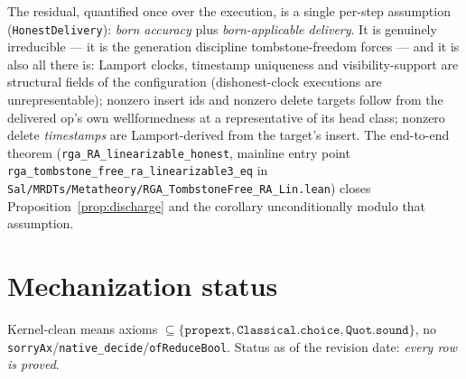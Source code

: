 \documentclass[11pt]{article}
\theoremstyle{definition}
\theoremstyle{remark}
\newcommand{\lean}[1]{\texttt{#1}}
\begin{document}
The residual, quantified once over the execution, is a single per-step assumption
(\lean{HonestDelivery}): \emph{born accuracy} plus \emph{born-applicable delivery}. It is
genuinely irreducible --- it is the generation discipline tombstone-freedom forces --- and it
is also all there is: Lamport clocks, timestamp uniqueness and visibility-support are
structural fields of the configuration (dishonest-clock executions are unrepresentable);
nonzero insert ids and nonzero delete targets follow from the delivered op's own
wellformedness at a representative of its head class; nonzero delete \emph{timestamps} are
Lamport-derived from the target's insert. The end-to-end theorem
(\lean{rga\_RA\_linearizable\_honest}, mainline entry point
\lean{rga\_tombstone\_free\_ra\_linearizable3\_eq} in
\lean{Sal/MRDTs/Metatheory/RGA\_TombstoneFree\_RA\_Lin.lean}) closes
Proposition~\ref{prop:discharge} and the corollary unconditionally modulo that assumption.

\section{Mechanization status}\label{sec:status}

Kernel-clean means axioms $\subseteq\{\texttt{propext},\texttt{Classical.choice},\texttt{Quot.sound}\}$,
no \texttt{sorryAx}/\texttt{native\_decide}/\texttt{ofReduceBool}. Status as of the
revision date: \emph{every row is proved}.
\end{document}
